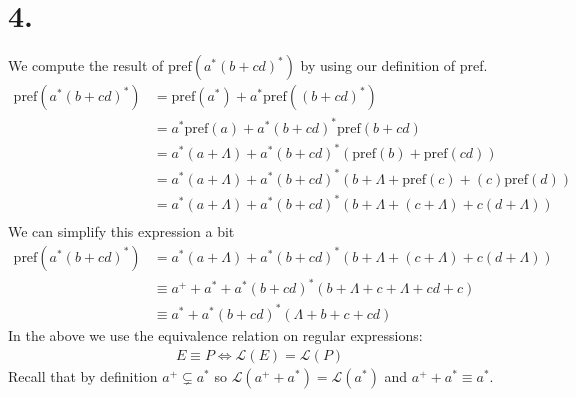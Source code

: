 \documentclass{article}
\theoremstyle{remark}
\numberwithin{equation}{section}
\begin{document}
	\section*{4.}
	We compute the result of $\text{pref}(a^*(b+cd)^*)$ by using our definition of pref.\\
	\begin{align*}
	\text{pref}(a^*(b+cd)^*)
	&=\text{pref}(a^*)+a^*\text{pref}((b+cd)^*)\\
	&=a^* \text{pref}(a) + a^*(b+cd)^*\text{pref}(b+cd)\\
	&=a^*(a+\Lambda) + a^*(b+cd)^*(\text{pref}(b)+\text{pref}(cd))\\
	&=a^*(a+\Lambda) + a^*(b+cd)^*(b+\Lambda + \text{pref}(c)+(c) \text{pref}(d))\\
	&=a^*(a+\Lambda) + a^*(b+cd)^*(b+\Lambda+(c+\Lambda)+c(d+\Lambda))\\
	\end{align*}
	We can simplify this expression a bit
	\begin{align*}
	\text{pref}(a^*(b+cd)^*) &= a^*(a+\Lambda) + a^*(b+cd)^*(b+\Lambda+(c+\Lambda)+c(d+\Lambda))\\
	&\equiv a^++a^* + a^*(b+cd)^*(b+\Lambda+c+\Lambda+cd+c)\\
	&\equiv a^* + a^*(b+cd)^*(\Lambda+b+c+cd)
	\end{align*}
	In the above we use the equivalence relation on regular expressions:
	\begin{align*}
	E\equiv P \iff \mathcal{L}(E) = \mathcal{L}(P)
	\end{align*}
	Recall that by definition $a^+\subsetneq a^*$ so $\mathcal{L}(a^++a^*)=\mathcal{L}(a^*)$ and $a^++a^*\equiv a^*$.
	
\end{document}
